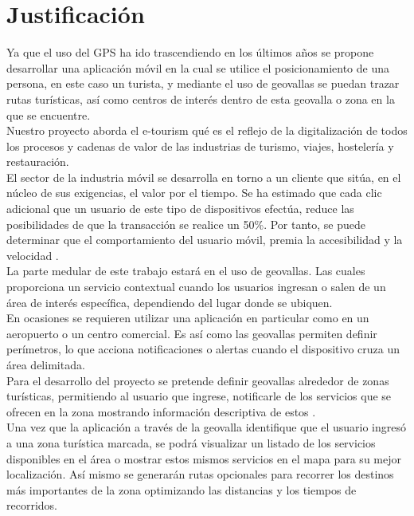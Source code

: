 \chapter{Justificación}

Ya que el uso del GPS ha ido trascendiendo en los últimos años se propone desarrollar una aplicación móvil en la cual se utilice el posicionamiento de una persona, en este caso un turista, y mediante el uso de geovallas se puedan trazar rutas turísticas, así como centros de interés dentro de esta geovalla o zona en la que se encuentre. \\

Nuestro proyecto aborda el e-tourism qué es el reflejo de la digitalización de todos los procesos y cadenas de valor de las industrias de turismo, viajes, hostelería y restauración. \\

El sector de la industria móvil se desarrolla en torno a un cliente que sitúa, en el núcleo de sus exigencias, el valor por el tiempo. Se ha estimado que cada clic adicional que un usuario de este tipo de dispositivos efectúa, reduce las posibilidades de que la transacción se realice un 50\%. Por tanto, se puede determinar que el comportamiento del usuario móvil, premia la accesibilidad y la velocidad \cite{mtourism}. \\

La parte medular de este trabajo estará en el uso de geovallas. Las cuales proporciona un servicio contextual cuando los usuarios ingresan o salen de un área de interés específica, dependiendo del lugar donde se ubiquen. \\

En ocasiones se requieren utilizar una aplicación en particular como en un aeropuerto o un centro comercial. Es así como las geovallas permiten definir perímetros, lo que acciona notificaciones o alertas cuando el dispositivo cruza un área delimitada.\\

Para el desarrollo del proyecto se pretende definir geovallas alrededor de zonas turísticas, permitiendo al usuario que ingrese, notificarle de los servicios que se ofrecen en la zona mostrando información descriptiva de estos \cite{mtourism}.\\

Una vez que la aplicación a través de la geovalla identifique que el usuario ingresó a una zona turística marcada, se podrá visualizar un listado de los servicios disponibles en el área o mostrar estos mismos servicios en el mapa para su mejor localización. Así mismo se generarán rutas opcionales para recorrer los destinos más importantes de la zona optimizando las distancias y los tiempos de recorridos.\\


